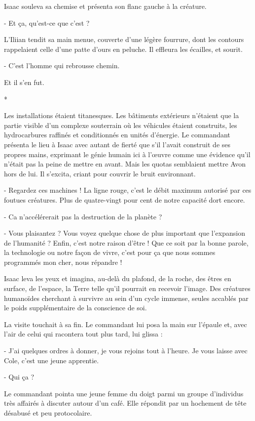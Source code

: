 \documentclass[12pt]{book}
\newcommand{\s}{\begin{center}
*
\end{center}
}
\begin{document}
Isaac souleva sa chemise et présenta son flanc gauche à la créature.


-  Et ça, qu’est-ce que c’est ?


L’Iliian tendit sa main menue, couverte d’une légère fourrure, dont les contours rappelaient celle d’une patte d’ours en peluche. Il effleura les écailles, et sourit.


-  C’est l’homme qui rebrousse chemin.


Et il s’en fut.


\s


Les installations étaient titanesques. Les bâtiments extérieurs n’étaient que la partie visible d’un complexe souterrain où les véhicules étaient construits, les hydrocarbures raffinés et conditionnés en unités d’énergie. Le commandant présenta le lieu à Isaac avec autant de fierté que s’il l’avait construit de ses propres mains, exprimant le génie humain ici à l’œuvre comme une évidence qu’il n’était pas la peine de mettre en avant. Mais les quotas semblaient mettre Avon hors de lui. Il s’excita, criant pour couvrir le bruit environnant.

-  Regardez ces machines ! La ligne rouge, c’est le débit maximum autorisé par ces foutues créatures. Plus de quatre-vingt pour cent de notre capacité dort encore.

-  Ca n’accélérerait pas la destruction de la planète ?

-  Vous plaisantez ? Vous voyez quelque chose de plus important que l’expansion de l’humanité ? Enfin, c’est notre raison d’être ! Que ce soit par la bonne parole, la technologie ou notre façon de vivre, c’est pour ça que nous sommes programmés mon cher, nous répandre !


Isaac leva les yeux et imagina, au-delà du plafond, de la roche, des êtres en surface, de l’espace, la Terre telle qu’il pourrait en recevoir l’image. Des créatures humanoïdes cherchant à survivre au sein d’un cycle immense, seules accablés par le poids supplémentaire de la conscience de soi.


La visite touchait à sa fin. Le commandant lui posa la main sur l’épaule et, avec l’air de celui qui racontera tout plus tard, lui glissa :


-  J’ai quelques ordres à donner, je vous rejoins tout à l’heure. Je vous laisse avec Cole, c’est une jeune apprentie.

 -  Qui ça ?


Le commandant pointa une jeune femme du doigt parmi un groupe d’individus très affairés à discuter autour d’un café. Elle répondit par un hochement de tête désabusé et peu protocolaire.
\end{document}

